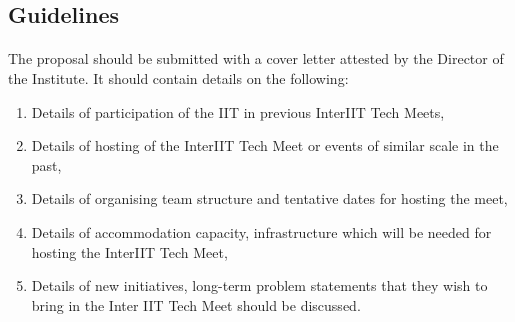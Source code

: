 \subsection{Guidelines}
\paragraph{}
The proposal should be submitted with a cover letter attested by the Director of the Institute.
It should contain details on the following:
\begin{enumerate}
    \item Details of participation of the IIT in previous InterIIT Tech Meets,
    \item Details of hosting of the InterIIT Tech Meet or events of similar scale in the past,
    \item Details of organising team structure and tentative dates for hosting the meet,
    \item Details of accommodation capacity, infrastructure which will be needed for hosting the InterIIT Tech Meet,
    \item Details of new initiatives, long-term problem statements that they wish to bring in the Inter IIT Tech Meet should be discussed.
\end{enumerate}
